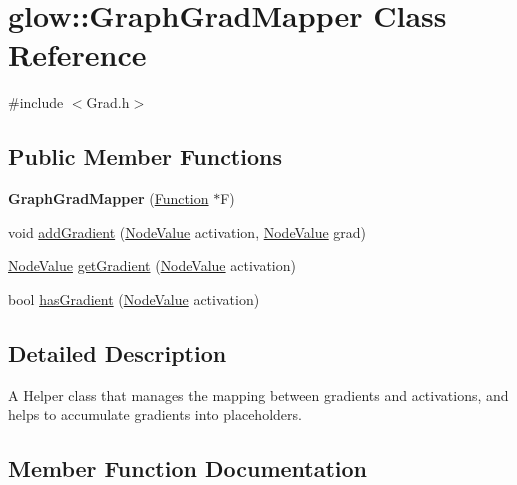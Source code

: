 \hypertarget{classglow_1_1_graph_grad_mapper}{}\section{glow\+:\+:Graph\+Grad\+Mapper Class Reference}
\label{classglow_1_1_graph_grad_mapper}


{\ttfamily \#include $<$Grad.\+h$>$}

\subsection*{Public Member Functions}
\begin{DoxyCompactItemize}
\item 
\mbox{\label{classglow_1_1_graph_grad_mapper_a3149fe116142ee6d8a770b0548cd01f2}} 
{\bfseries Graph\+Grad\+Mapper} (\hyperlink{classglow_1_1_function}{Function} $\ast$F)
\item 
void \hyperlink{classglow_1_1_graph_grad_mapper_addce94263ca0ac1734886eddc661c76c}{add\+Gradient} (\hyperlink{structglow_1_1_node_value}{Node\+Value} activation, \hyperlink{structglow_1_1_node_value}{Node\+Value} grad)
\item 
\hyperlink{structglow_1_1_node_value}{Node\+Value} \hyperlink{classglow_1_1_graph_grad_mapper_a6a14b27336f7054e326bbaa46b94edec}{get\+Gradient} (\hyperlink{structglow_1_1_node_value}{Node\+Value} activation)
\item 
bool \hyperlink{classglow_1_1_graph_grad_mapper_a65988a9626ac25e16111a35c50b7d65e}{has\+Gradient} (\hyperlink{structglow_1_1_node_value}{Node\+Value} activation)
\end{DoxyCompactItemize}


\subsection{Detailed Description}
A Helper class that manages the mapping between gradients and activations, and helps to accumulate gradients into placeholders. 

\subsection{Member Function Documentation}
\mbox{\label{classglow_1_1_graph_grad_mapper_addce94263ca0ac1734886eddc661c76c}} 
